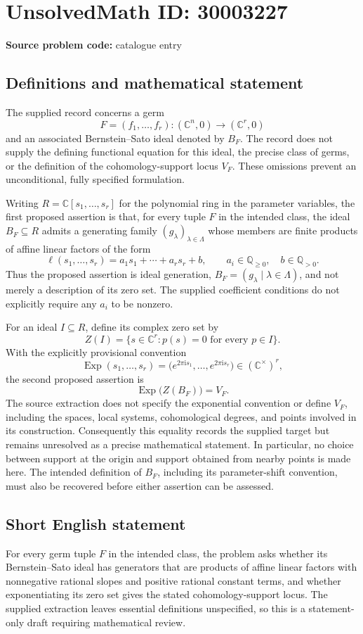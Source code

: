 \documentclass[11pt]{article}
\newcommand{\Q}{\mathbb{Q}}
\newcommand{\C}{\mathbb{C}}
\begin{document}
\section*{UnsolvedMath ID: 30003227}
\textbf{Source problem code:} catalogue entry
\subsection{Definitions and mathematical statement}
The supplied record concerns a germ
\[
F=(f_1,\ldots,f_r):(\C^n,0)\longrightarrow(\C^r,0)
\]
and an associated Bernstein--Sato ideal denoted by \(B_F\). The record does not supply the defining functional equation for this ideal, the precise class of germs, or the definition of the cohomology-support locus \(V_F\). These omissions prevent an unconditional, fully specified formulation.

Writing \(R=\C[s_1,\ldots,s_r]\) for the polynomial ring in the parameter variables, the first proposed assertion is that, for every tuple \(F\) in the intended class, the ideal \(B_F\subseteq R\) admits a generating family \((g_\lambda)_{\lambda\in\Lambda}\) whose members are finite products of affine linear factors of the form
\[
\ell(s_1,\ldots,s_r)=a_1s_1+\cdots+a_rs_r+b,
\qquad a_i\in\Q_{\geq0},\quad b\in\Q_{>0}.
\]
Thus the proposed assertion is ideal generation, \(B_F=(g_\lambda\mid\lambda\in\Lambda)\), and not merely a description of its zero set. The supplied coefficient conditions do not explicitly require any \(a_i\) to be nonzero.

For an ideal \(I\subseteq R\), define its complex zero set by
\[
Z(I)=\{s\in\C^r:p(s)=0\text{ for every }p\in I\}.
\]
With the explicitly provisional convention
\[
\operatorname{Exp}(s_1,\ldots,s_r)
 =\bigl(e^{2\pi\mathrm{i}s_1},\ldots,e^{2\pi\mathrm{i}s_r}\bigr)
 \in(\C^\times)^r,
\]
the second proposed assertion is
\[
\operatorname{Exp}\bigl(Z(B_F)\bigr)=V_F.
\]
The source extraction does not specify the exponential convention or define \(V_F\), including the spaces, local systems, cohomological degrees, and points involved in its construction. Consequently this equality records the supplied target but remains unresolved as a precise mathematical statement. In particular, no choice between support at the origin and support obtained from nearby points is made here. The intended definition of \(B_F\), including its parameter-shift convention, must also be recovered before either assertion can be assessed.
\subsection{Short English statement}
For every germ tuple \(F\) in the intended class, the problem asks whether its Bernstein--Sato ideal has generators that are products of affine linear factors with nonnegative rational slopes and positive rational constant terms, and whether exponentiating its zero set gives the stated cohomology-support locus. The supplied extraction leaves essential definitions unspecified, so this is a statement-only draft requiring mathematical review.
\end{document}
